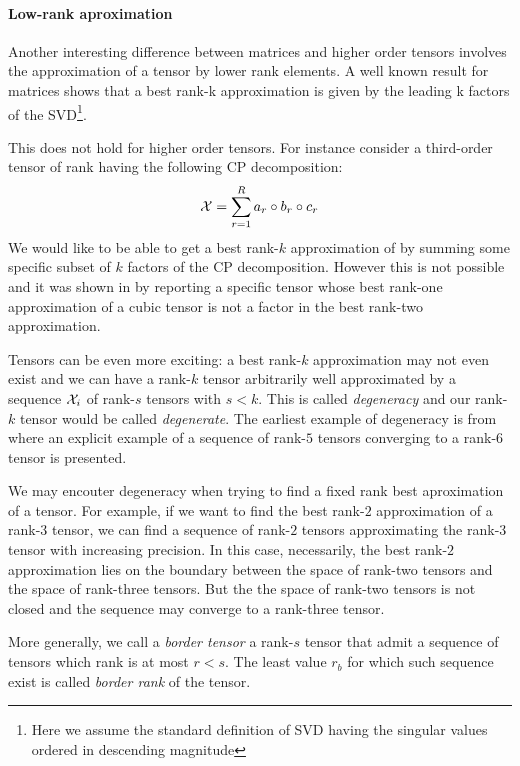 \paragraph{Low-rank aproximation}
Another interesting difference between matrices and higher order tensors involves the approximation of a tensor by lower rank elements.
A well known result for matrices \cite{SVDbestapprox} shows that a best rank-k approximation is given by the leading k factors of the SVD\footnote{Here we assume the standard definition of SVD having the singular values ordered in descending magnitude}.

This does not hold for higher order tensors. For instance consider a third-order tensor of rank \R having the following CP decomposition:
\begin{equation*}
  \mathcal{X} = \sum_{r=1}^R a_r \circ b_r \circ c_r
\end{equation*}
We would like to be able to get a best rank-$k$ approximation of \X by summing some specific subset of $k$ factors of the CP decomposition. However this is not possible and it was shown in \cite{kolda2001orthogonal} by reporting a specific tensor whose best rank-one approximation of a cubic tensor is not a factor in the best rank-two approximation.

Tensors can be even more exciting: a best rank-$k$ approximation may not even exist and we can have a rank-$k$ tensor \X arbitrarily well approximated by a sequence ${\mathcal{X}_i}$ of rank-$s$ tensors with $s < k$. This is called \emph{degeneracy} and our rank-$k$ tensor would be called \emph{degenerate}.
The earliest example of degeneracy is from \cite{bini1980approximate} where an explicit example of a sequence of rank-$5$ tensors converging to a rank-$6$ tensor is presented.

We may encouter degeneracy when trying to find a fixed rank best aproximation of a tensor. For example, if we want to find the best rank-$2$ approximation of a rank-$3$ tensor, we can find a sequence of rank-$2$ tensors approximating the rank-$3$ tensor with increasing precision. In this case, necessarily, the best rank-$2$ approximation lies on the boundary between the space of rank-two tensors and the space of rank-three tensors. But the the space of rank-two tensors is not closed and the sequence may converge to a rank-three tensor.

More generally, we call a \emph{border tensor} a rank-$s$ tensor that admit a sequence of tensors which rank is at most $r < s$. The least value $r_b$ for which such sequence exist is called \emph{border rank} of the tensor.

